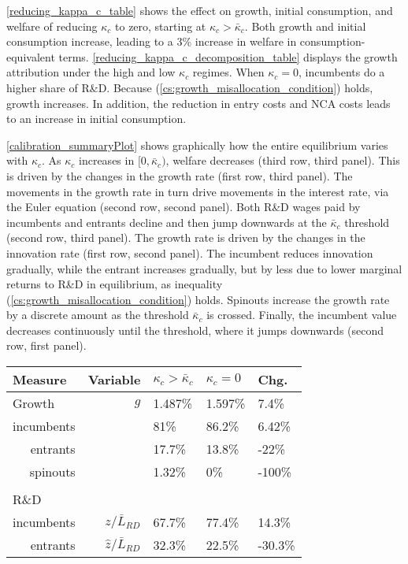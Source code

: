\documentclass[11pt,english]{article}
\begin{document}
\autoref{reducing_kappa_c_table} shows the effect on growth, initial consumption, and welfare of reducing $\kappa_c$ to zero, starting at $\kappa_c > \bar{\kappa}_c$. Both growth and initial consumption increase, leading to a 3\% increase in welfare in consumption-equivalent terms. \autoref{reducing_kappa_c_decomposition_table} displays the growth attribution under the high and low $\kappa_c$ regimes. When $\kappa_c = 0$, incumbents do a higher share of R\&D. Because (\ref{cs:growth_misallocation_condition}) holds, growth increases. In addition, the reduction in entry costs and NCA costs leads to an increase in initial consumption.  

\autoref{calibration_summaryPlot} shows graphically how the entire equilibrium varies with $\kappa_c$. As $\kappa_c$ increases in $[0,\bar{\kappa}_c)$, welfare decreases (third row, third panel). This is driven by the changes in the growth rate (first row, third panel). The movements in the growth rate in turn drive movements in the interest rate, via the Euler equation (second row, second panel). Both R\&D wages paid by incumbents and entrants decline and then jump downwards at the $\bar{\kappa}_c$ threshold (second row, third panel). The growth rate is driven by the changes in the innovation rate (first row, second panel). The incumbent reduces innovation gradually, while the entrant increases gradually, but by less due to lower marginal returns to R\&D in equilibrium, as inequality (\ref{cs:growth_misallocation_condition}) holds. Spinouts increase the growth rate by a discrete amount as the threshold $\bar{\kappa}_c$ is crossed. Finally, the incumbent value decreases continuously until the threshold, where it jumps downwards (second row, first panel). 

\begin{table}
	\centering
	\label{reducing_kappa_c_decomposition_table}
	\begin{tabular}{lrlll}
		\toprule \toprule
		Measure & Variable & $\kappa_c > \bar{\kappa}_c$ & $\kappa_c = 0$ & Chg. \tabularnewline
		\midrule
		Growth & $g$ & 1.487\% & 1.597\% & 7.4\% \tabularnewline
		\multicolumn{1}{r}{incumbents} &  & 81\% & 86.2\% & 6.42\% \tabularnewline
		\multicolumn{1}{r}{entrants} &  & 17.7\% & 13.8\% & -22\% \tabularnewline
		\multicolumn{1}{r}{spinouts} &  & 1.32\% & 0\% & -100\% \tabularnewline
		\tabularnewline
		R\&D & & & & 
		\tabularnewline
		\multicolumn{1}{r}{incumbents}  & $z / \bar{L}_{RD}$ & 67.7\% & 77.4\% & 14.3\% \tabularnewline 
		
		\multicolumn{1}{r}{entrants}  & $\hat{z} / \bar{L}_{RD}$ & 32.3\% & 22.5\% & -30.3\% \tabularnewline
		\bottomrule
	\end{tabular}
\end{table}
\end{document}
